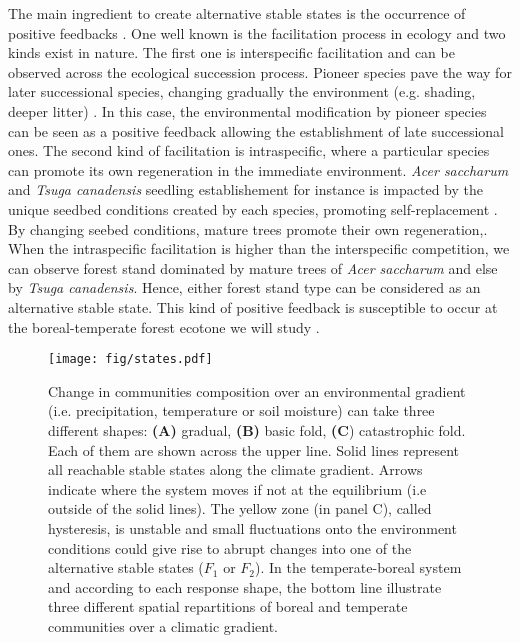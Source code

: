 The main ingredient to create alternative stable states is the occurrence of
positive feedbacks \cite{scheffer2009critical,Schroder2005}. One well known is
the facilitation process in ecology and two kinds exist in nature. The first
one is interspecific facilitation and can be observed across the ecological
succession process. Pioneer species pave the way for later successional
species, changing gradually the environment (e.g. shading, deeper litter)
\cite{scheffer2009critical, Levine2006}. In this case, the environmental
modification by pioneer species can be seen as a positive feedback allowing
the establishment of late successional ones.  The second kind of facilitation
is intraspecific, where a particular species can promote its own regeneration
in the immediate environment. \textit{Acer saccharum} and \textit{Tsuga
canadensis} seedling establishement for instance is impacted by the unique
seedbed conditions created by each species, promoting self-replacement
\cite{Society2014,McCarthyNeumann2012}. By changing seebed conditions, mature
trees promote their own regeneration,. When the intraspecific facilitation is
higher than the interspecific competition, we can observe forest stand
dominated by mature trees of \textit{Acer saccharum} and else by \textit{Tsuga
canadensis}. Hence, either forest stand type can be considered as an
alternative stable state. This kind of positive feedback is susceptible to
occur at the boreal-temperate forest ecotone we will study
\cite{Barras1998,Society2014}. \\



\begin{figure}[t]
	\begin{center}
	\texttt{[image: fig/states.pdf]}
	\end{center}
	\caption{Change in communities composition over an environmental gradient (i.e. precipitation, temperature or soil moisture) can take three different shapes: \textbf{(A)} gradual, \textbf{(B)} basic fold,
	\textbf{(C}) catastrophic fold. Each of them are shown across the upper
	line. Solid lines represent all reachable stable states along the climate gradient.  Arrows indicate
	where the system moves if not at the equilibrium (i.e outside of the solid lines). The yellow zone (in panel C),
	called hysteresis, is unstable and small fluctuations onto the environment
	conditions could give rise to abrupt changes into one of the alternative
	stable states ($F_1$ or $F_2$). In the temperate-boreal system and according to each response shape, the bottom line illustrate three different spatial repartitions of boreal and temperate communities over a climatic gradient.}
	\label{fig1}
	\vspace{-1em}
\end{figure}



